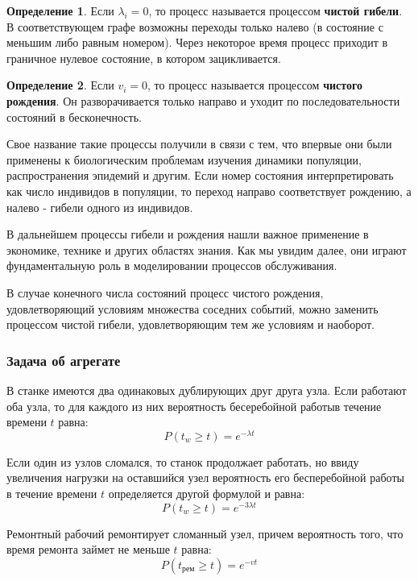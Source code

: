 \documentclass[aps,%
12pt,%
final,%
oneside,
onecolumn,%
musixtex, %
superscriptaddress,%
centertags]{article} %
\theoremstyle{plain}
\theoremstyle{definition}
\newtheorem{definition}{Определение}[subsection]
\theoremstyle{remark}
\begin{document}
\begin{definition}
	Если $\lambda_i = 0$, то процесс называется процессом \textbf{чистой гибели}. В соответствующем графе возможны переходы только налево (в состояние с меньшим либо равным номером). Через некоторое время процесс приходит в граничное нулевое состояние, в котором зацикливается.
\end{definition}

\begin{definition}
	Если $v_i = 0$, то процесс называется процессом \textbf{чистого рождения}. Он разворачивается только направо и уходит по последовательности состояний в бесконечность.
\end{definition}

Свое название такие процессы получили в связи с тем, что впервые
они были применены к биологическим проблемам изучения динамики
популяции, распространения эпидемий и другим. Если номер состояния
интерпретировать как число индивидов в популяции, то переход направо
соответствует рождению, а налево - гибели одного из индивидов.

В дальнейшем процессы гибели и рождения нашли важное
применение в экономике, технике и других областях знания. Как мы
увидим далее, они играют фундаментальную роль в моделировании
процессов обслуживания.

В случае конечного числа состояний процесс чистого рождения, удовлетворяющий условиям множества соседних событий, можно заменить процессом чистой гибели, удовлетворяющим тем же условиям и наоборот.

\subsubsection{Задача об агрегате}

В станке имеются два одинаковых дублирующих друг друга узла. Если работают оба узла, то для каждого из них вероятность бесеребойной работыв течение времени $t$ равна:
$$P(t_w \geq t) = e^{-\lambda t}$$

Если один из узлов сломался, то станок продолжает работать, но ввиду увеличения нагрузки на оставшийся узел вероятность его бесперебойной работы в течение времени $t$ определяется другой формулой и равна:
$$P(t_w \geq t) = e^{-3\lambda t}$$

Ремонтный рабочий ремонтирует сломанный узел, причем вероятность того, что время ремонта займет не меньше $t$ равна:
$$P(t_{\text{рем}} \geq t) = e^{-v t}$$
\end{document}
